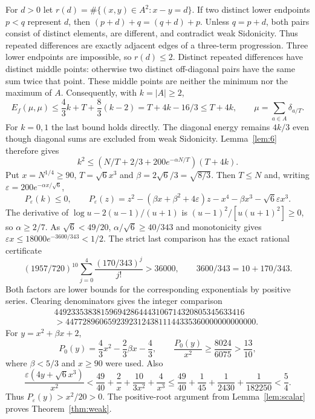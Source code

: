 \documentclass[10pt]{article}
\makeatletter
\numberwithin{equation}{section}
\theoremstyle{remark}
\renewcommand\subsection{\@startsection{subsection}{2}{\z@}{-2.2ex \@plus -.6ex \@minus -.2ex}{1ex \@plus .2ex}{\normalfont\normalsize\bfseries}}
\makeatother
\begin{document}
\subsection{Weak Sidon sets}
For $d>0$ let $r(d)=\#\{(x,y)\in A^2:x-y=d\}$. If two distinct
lower endpoints $p<q$ represent $d$, then
$(p+d)+q=(q+d)+p$. Unless $q=p+d$, both pairs consist of distinct
elements, are different, and contradict weak Sidonicity.
Thus repeated differences are exactly adjacent edges of a three-term
progression. Three lower endpoints are impossible, so $r(d)\le2$.
Distinct repeated differences have distinct middle points: otherwise
two distinct off-diagonal pairs have the same sum twice that point.
These middle points are neither the minimum nor the maximum of $A$.
Consequently, with $k=|A|\ge2$,
\begin{equation}\label{eq:weak-energy}
 E_f(\mu,\mu)\le\frac43k+T+\frac83(k-2)
                 =T+4k-16/3\le T+4k,
 \qquad \mu=\sum_{a\in A}\delta_{a/T}.
\end{equation}
For $k=0,1$ the last bound holds directly. The diagonal energy remains
$4k/3$ even though diagonal sums are excluded from weak Sidonicity.
Lemma~\ref{lem:6} therefore gives
\[
 k^2\le(N/T+2/3+200e^{-\alpha N/T})(T+4k).
\]
Put $x=N^{1/4}\ge90$, $T=\sqrt6x^3$ and $\beta=2\sqrt6/3=\sqrt{8/3}$.
Then $T\le N$ and, writing $\varepsilon=200e^{-\alpha x/\sqrt6}$,
\begin{equation}\label{eq:weak-poly}
 P_\varepsilon(k)\le0,\qquad
 P_\varepsilon(z)=z^2-(\beta x+\beta^2+4\varepsilon)z
                   -x^4-\beta x^3-\sqrt6\varepsilon x^3.
\end{equation}
The derivative of $\log u-2(u-1)/(u+1)$ is
$(u-1)^2/[u(u+1)^2]\ge0$, so $\alpha\ge2/7$.
As $\sqrt6<49/20$, $\alpha/\sqrt6\ge40/343$ and monotonicity gives
$\varepsilon x\le18000e^{-3600/343}<1/2$.
The strict last comparison has the exact rational certificate
\[
 (1957/720)^{10}\sum_{j=0}^4\frac{(170/343)^j}{j!}>36000,
 \qquad 3600/343=10+170/343.
\]
Both factors are lower bounds for the corresponding exponentials by
positive series. Clearing denominators gives the integer comparison
\[
\begin{split}
449233538381596942864443106714320805345633416\quad\quad\\
{}>447728960659239231243811144335360000000000000.
\end{split}
\]
For $y=x^2+\beta x+2$,
\[
 P_0(y)=\frac43x^2-\frac23\beta x-\frac43,\qquad
 \frac{P_0(y)}{x^2}\ge\frac{8024}{6075}>\frac{13}{10},
\]
where $\beta<5/3$ and $x\ge90$ were used. Also
\[
 \frac{\varepsilon(4y+\sqrt6x^3)}{x^2}
 <\frac{49}{40}+\frac2x+\frac{10}{3x^2}+\frac4{x^3}
 \le\frac{49}{40}+\frac1{45}+\frac1{2430}+\frac1{182250}<\frac54.
\]
Thus $P_\varepsilon(y)>x^2/20>0$. The positive-root argument from
Lemma~\ref{lem:scalar} proves Theorem~\ref{thm:weak}.
\end{document}
